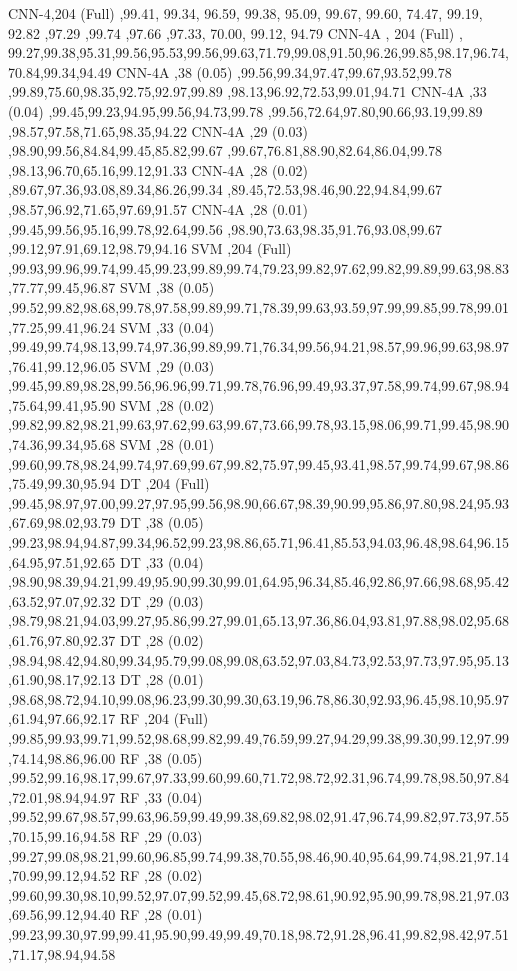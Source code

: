 \documentclass[journal]{IEEEtran}
\begin{document}
\begin{table*}[ht!]
{CNN-4,204 (Full) ,99.41,	99.34,	96.59,	99.38,	95.09,	99.67,	99.60,	74.47,	99.19,	92.82	,97.29	,99.74	,97.66	,97.33,	70.00,	99.12,	94.79
CNN-4A  , 204 (Full) , 99.27,99.38,95.31,99.56,95.53,99.56,99.63,71.79,99.08,91.50,96.26,99.85,98.17,96.74,70.84,99.34,94.49
CNN-4A	,38 (0.05)	,99.56,99.34,97.47,99.67,93.52,99.78	,99.89,75.60,98.35,92.75,92.97,99.89	,98.13,96.92,72.53,99.01,94.71
CNN-4A	,33 (0.04)	,99.45,99.23,94.95,99.56,94.73,99.78	,99.56,72.64,97.80,90.66,93.19,99.89	,98.57,97.58,71.65,98.35,94.22
CNN-4A	,29 (0.03)	,98.90,99.56,84.84,99.45,85.82,99.67	,99.67,76.81,88.90,82.64,86.04,99.78	,98.13,96.70,65.16,99.12,91.33
CNN-4A	,28 (0.02)	,89.67,97.36,93.08,89.34,86.26,99.34	,89.45,72.53,98.46,90.22,94.84,99.67	,98.57,96.92,71.65,97.69,91.57
CNN-4A	,28 (0.01)	,99.45,99.56,95.16,99.78,92.64,99.56	,98.90,73.63,98.35,91.76,93.08,99.67	,99.12,97.91,69.12,98.79,94.16
SVM	,204 (Full)	,99.93,99.96,99.74,99.45,99.23,99.89,99.74,79.23,99.82,97.62,99.82,99.89,99.63,98.83,77.77,99.45,96.87
SVM	,38 (0.05)	,99.52,99.82,98.68,99.78,97.58,99.89,99.71,78.39,99.63,93.59,97.99,99.85,99.78,99.01,77.25,99.41,96.24
SVM	,33 (0.04)	,99.49,99.74,98.13,99.74,97.36,99.89,99.71,76.34,99.56,94.21,98.57,99.96,99.63,98.97,76.41,99.12,96.05
SVM	,29 (0.03)	,99.45,99.89,98.28,99.56,96.96,99.71,99.78,76.96,99.49,93.37,97.58,99.74,99.67,98.94,75.64,99.41,95.90
SVM	,28 (0.02)	,99.82,99.82,98.21,99.63,97.62,99.63,99.67,73.66,99.78,93.15,98.06,99.71,99.45,98.90,74.36,99.34,95.68
SVM	,28 (0.01)	,99.60,99.78,98.24,99.74,97.69,99.67,99.82,75.97,99.45,93.41,98.57,99.74,99.67,98.86,75.49,99.30,95.94
DT	,204 (Full)	,99.45,98.97,97.00,99.27,97.95,99.56,98.90,66.67,98.39,90.99,95.86,97.80,98.24,95.93,67.69,98.02,93.79
DT	,38 (0.05)	,99.23,98.94,94.87,99.34,96.52,99.23,98.86,65.71,96.41,85.53,94.03,96.48,98.64,96.15,64.95,97.51,92.65
DT	,33 (0.04)	,98.90,98.39,94.21,99.49,95.90,99.30,99.01,64.95,96.34,85.46,92.86,97.66,98.68,95.42,63.52,97.07,92.32
DT	,29 (0.03)	,98.79,98.21,94.03,99.27,95.86,99.27,99.01,65.13,97.36,86.04,93.81,97.88,98.02,95.68,61.76,97.80,92.37
DT	,28 (0.02)	,98.94,98.42,94.80,99.34,95.79,99.08,99.08,63.52,97.03,84.73,92.53,97.73,97.95,95.13,61.90,98.17,92.13
DT	,28 (0.01)	,98.68,98.72,94.10,99.08,96.23,99.30,99.30,63.19,96.78,86.30,92.93,96.45,98.10,95.97,61.94,97.66,92.17
RF	,204 (Full)	,99.85,99.93,99.71,99.52,98.68,99.82,99.49,76.59,99.27,94.29,99.38,99.30,99.12,97.99,74.14,98.86,96.00
RF	,38 (0.05)	,99.52,99.16,98.17,99.67,97.33,99.60,99.60,71.72,98.72,92.31,96.74,99.78,98.50,97.84,72.01,98.94,94.97
RF	,33 (0.04)	,99.52,99.67,98.57,99.63,96.59,99.49,99.38,69.82,98.02,91.47,96.74,99.82,97.73,97.55,70.15,99.16,94.58
RF	,29 (0.03)	,99.27,99.08,98.21,99.60,96.85,99.74,99.38,70.55,98.46,90.40,95.64,99.74,98.21,97.14,70.99,99.12,94.52
RF	,28 (0.02)	,99.60,99.30,98.10,99.52,97.07,99.52,99.45,68.72,98.61,90.92,95.90,99.78,98.21,97.03,69.56,99.12,94.40
RF	,28 (0.01)	,99.23,99.30,97.99,99.41,95.90,99.49,99.49,70.18,98.72,91.28,96.41,99.82,98.42,97.51,71.17,98.94,94.58
}\vrule
\end{table*}
\end{document}
